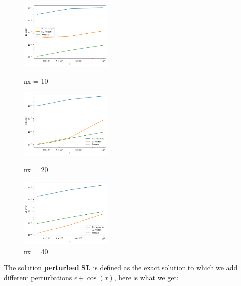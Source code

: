 \documentclass{article}
\begin{document}
\begin{figure}[!h]
    \centering
    \includegraphics[width=0.4\textwidth]{images/i110.png}
    \caption{nx = 10}
    \includegraphics[width=0.4\textwidth]{images/i120.png}
    \caption{nx = 20}
    \includegraphics[width=0.4\textwidth]{images/i1.png}
    \caption{nx = 40}
\end{figure}

\newpage

The solution \textbf{perturbed SL} is defined as the exact solution to which we add different perturbations $\epsilon + \cos(x)$, here is what we get:\\
\end{document}
